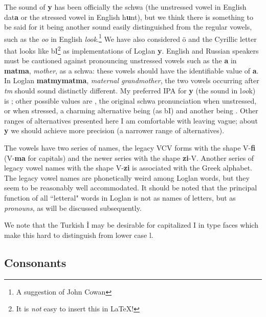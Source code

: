 \documentclass[12pt]{book}
\begin{document}
  The sound of {\bf y} has been officially the schwa (the unstressed vowel in English dat{\bf a} or the stressed vowel in English h{\bf u}nt), but we think there is something to be said for it being another sound easily distinguished from the regular vowels, such as the {\em oo} in English {\em look}.\footnote{A suggestion of John Cowan}  We have also considered \"o and the Cyrillic letter that looks like bI\footnote{It is {\em not\/} easy to insert this in LaTeX!} as implementations of Loglan {\bf y}.  English and Russian speakers must be cautioned against pronouncing unstressed vowels such as the
{\bf a} in {\bf matma}, {\em mother\/}, as a schwa:  these vowels should have the identifiable value of {\bf a}.  In Loglan {\bf matmymatma}, {\em maternal grandmother\/}, the two vowels occurring after {\em tm} should sound distinctly different.  My preferred IPA for {\bf y} (the sound in l{\em oo}k) is ;  other possible values are , the original schwa pronunciation when unstressed, or  when stressed, a charming alternative being  (as bI) and another being \textipa{\o}.  Other ranges of alternatives presented here I am comfortable with leaving vague;  about {\bf y} we should achieve more precision (a narrower range of alternatives).

The vowels have two series of names, the legacy VCV forms with the shape V-{\bf fi} (V-{\bf ma} for capitals) and the newer series with the shape {\bf zi}-V.  Another series of legacy vowel names with the shape V-{\bf zi} is associated with the Greek alphabet.  The legacy vowel names are phonetically weird among Loglan words, but they seem to be reasonably well accommodated.  It should be noted that the principal function of all ``letteral" words in Loglan is not as names of letters, but as {\em pronouns\/}, as will be discussed subsequently.

We note that the Turkish \.I may be desirable for capitalized I in type faces which make this hard to distinguish from lower case l.
\subsection{Consonants}
\end{document}
